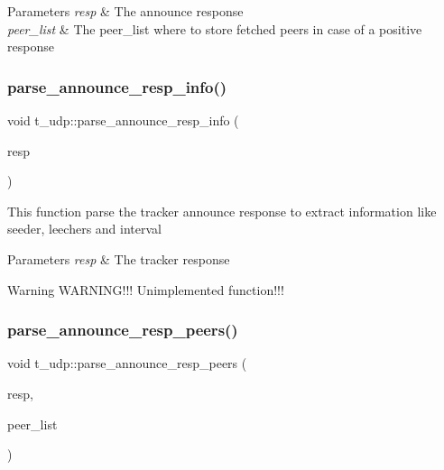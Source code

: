 \begin{DoxyParams}{Parameters}
{\em resp} & The announce response \\
\hline
{\em peer\+\_\+list} & The peer\+\_\+list where to store fetched peers in case of a positive response \\
\hline
\end{DoxyParams}
\mbox{\label{namespacet__udp_a42ced8af1acd3fb2bc46358effe48dbc}} 
\subsubsection{\texorpdfstring{parse\+\_\+announce\+\_\+resp\+\_\+info()}{parse\_announce\_resp\_info()}}
{\footnotesize\ttfamily void t\+\_\+udp\+::parse\+\_\+announce\+\_\+resp\+\_\+info (\begin{DoxyParamCaption}\item[{std\+::vector$<$ uint8\+\_\+t $>$ \&}]{resp }\end{DoxyParamCaption})}

This function parse the tracker announce response to extract information like seeder, leechers and interval


\begin{DoxyParams}{Parameters}
{\em resp} & The tracker response\\
\hline
\end{DoxyParams}
\begin{DoxyWarning}{Warning}
W\+A\+R\+N\+I\+N\+G!!! Unimplemented function!!! 
\end{DoxyWarning}
\mbox{\label{namespacet__udp_a8aa6906fdd81689928634df34688fed1}} 
\subsubsection{\texorpdfstring{parse\+\_\+announce\+\_\+resp\+\_\+peers()}{parse\_announce\_resp\_peers()}}
{\footnotesize\ttfamily void t\+\_\+udp\+::parse\+\_\+announce\+\_\+resp\+\_\+peers (\begin{DoxyParamCaption}\item[{std\+::vector$<$ uint8\+\_\+t $>$ \&}]{resp,  }\item[{pwp\+::\+Peer\+List}]{peer\+\_\+list }\end{DoxyParamCaption})}



